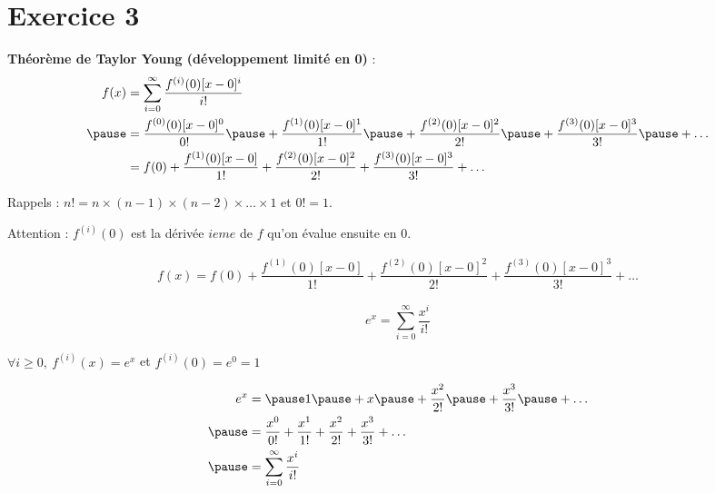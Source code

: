 \documentclass[9pt,handout,professionalfonts,hyperref]{beamer}
\begin{document}
\section{Exercice 3}
\begin{frame}
\textbf{Théorème de Taylor Young (développement limité en 0)} :
\pause
\medskip
\[\begin{aligned}
f(x)
&=\sum_{i=0}^{\infty}\dfrac{f^{(i)}(0)[x-0]^i}{i!} \\
\pause &=\dfrac{f^{(0)}(0)[x-0]^0}{0!}\pause +\dfrac{f^{(1)}(0)[x-0]^1}{1!}\pause +\dfrac{f^{(2)}(0)[x-0]^2}{2!}\pause +\dfrac{f^{(3)}(0)[x-0]^3}{3!}\pause +\dots\\
&=f(0)+\dfrac{f^{(1)}(0)[x-0]}{1!}+\dfrac{f^{(2)}(0)[x-0]^2}{2!}+\dfrac{f^{(3)}(0)[x-0]^3}{3!}+\dots
\end{aligned}\]

\medskip 
\pause Rappels : $n! = n\times (n-1)\times (n-2)\times \dots\times 1$ \pause et $0! = 1$. 

\medskip 
\pause Attention : $f^{(i)}(0)$ est la dérivée $ieme$ de $f$ qu'on évalue ensuite en $0$.

\end{frame}

\begin{frame}

\[\begin{aligned}
f(x)=f(0)+\dfrac{f^{(1)}(0)[x-0]}{1!}+\dfrac{f^{(2)}(0)[x-0]^2}{2!}+\dfrac{f^{(3)}(0)[x-0]^3}{3!}+\dots
\end{aligned}\]

$$
e^x=\sum_{i=0}^{\infty} \dfrac{x^i}{i!}
$$
\pause
\medskip

$\forall i\ge0,~f^{(i)}(x) = e^x$ \pause et $f^{(i)}(0) = e^0 =1 $

\pause
\medskip
\[\begin{aligned}
e^x
&=\pause 1\pause +x\pause +\frac{x^2}{2!}\pause +\dfrac{x^3}{3!}\pause +\dots\\
\pause &=\frac{x^0}{0!}+\frac{x^1}{1!}+\frac{x^2}{2!}+\dfrac{x^3}{3!}+\dots\\
\pause &=\sum_{i=0}^{\infty}\dfrac{x^i}{i!}
\end{aligned}\]

\end{frame}
\end{document}
